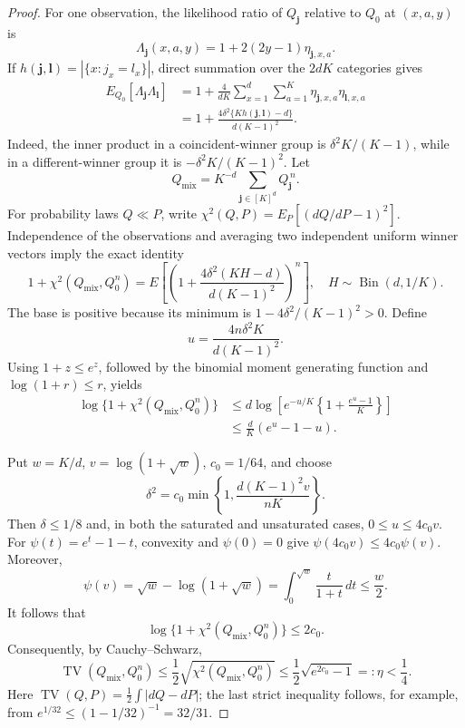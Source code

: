 \documentclass{article}
\begin{document}
\begin{proof}
For one observation, the likelihood ratio of \(Q_{\mathbf j}\) relative to \(Q_0\) at \((x,a,y)\) is
\[
 \Lambda_{\mathbf j}(x,a,y)=1+2(2y-1)\eta_{\mathbf j,x,a}.
\]
If \(h(\mathbf j,\mathbf l)=|\{x:j_x=l_x\}|\), direct summation over the \(2dK\) categories gives
\[
 \begin{aligned}
 E_{Q_0}[\Lambda_{\mathbf j}\Lambda_{\mathbf l}]
 &=1+\frac4{dK}\sum_{x=1}^d\sum_{a=1}^K
      \eta_{\mathbf j,x,a}\eta_{\mathbf l,x,a}\\
 &=1+\frac{4\delta^2\{K h(\mathbf j,\mathbf l)-d\}}
               {d(K-1)^2}.
 \end{aligned}
\]
Indeed, the inner product in a coincident-winner group is \(\delta^2K/(K-1)\), while in a different-winner group it is \(-\delta^2K/(K-1)^2\).  Let
\[
 Q_{\mathrm{mix}}=K^{-d}\sum_{\mathbf j\in[K]^d}Q_{\mathbf j}^{\,n}.
\]
For probability laws \(Q\ll P\), write
\(\chi^2(Q,P)=E_P[(dQ/dP-1)^2]\).
Independence of the observations and averaging two independent uniform winner vectors imply the exact identity
\[
 1+\chi^2(Q_{\mathrm{mix}},Q_0^n)
 =E\left[\left(1+\frac{4\delta^2(KH-d)}{d(K-1)^2}\right)^n\right],
 \quad H\sim\operatorname{Bin}(d,1/K).
\]
The base is positive because its minimum is \(1-4\delta^2/(K-1)^2>0\).  Define
\[
 u=\frac{4n\delta^2K}{d(K-1)^2}.
\]
Using \(1+z\leq e^z\), followed by the binomial moment generating function and \(\log(1+r)\leq r\), yields
\[
 \begin{aligned}
 \log\{1+\chi^2(Q_{\mathrm{mix}},Q_0^n)\}
 &\leq d\log\left[e^{-u/K}\left\{1+\frac{e^u-1}{K}\right\}\right]\\
 &\leq\frac dK(e^u-1-u).
 \end{aligned}
\]

Put \(w=K/d\), \(v=\log(1+\sqrt w)\), \(c_0=1/64\), and choose
\[
 \delta^2=c_0\min\left\{1,\frac{d(K-1)^2v}{nK}\right\}.
\]
Then \(\delta\leq1/8\) and, in both the saturated and unsaturated cases, \(0\leq u\leq4c_0v\).  For \(\psi(t)=e^t-1-t\), convexity and \(\psi(0)=0\) give \(\psi(4c_0v)\leq4c_0\psi(v)\).  Moreover,
\[
 \psi(v)=\sqrt w-\log(1+\sqrt w)
 =\int_0^{\sqrt w}\frac{t}{1+t}\,dt\leq\frac w2.
\]
It follows that
\[
 \log\{1+\chi^2(Q_{\mathrm{mix}},Q_0^n)\}\leq2c_0.
\]
Consequently, by Cauchy--Schwarz,
\[
 \operatorname{TV}(Q_{\mathrm{mix}},Q_0^n)
 \leq\frac12\sqrt{\chi^2(Q_{\mathrm{mix}},Q_0^n)}
 \leq\frac12\sqrt{e^{2c_0}-1}=: \eta<\frac14.
\]
Here
\(\operatorname{TV}(Q,P)=\frac12\int|dQ-dP|\); the last strict inequality follows, for example, from
\(e^{1/32}\leq(1-1/32)^{-1}=32/31\).


\end{proof}
\end{document}
